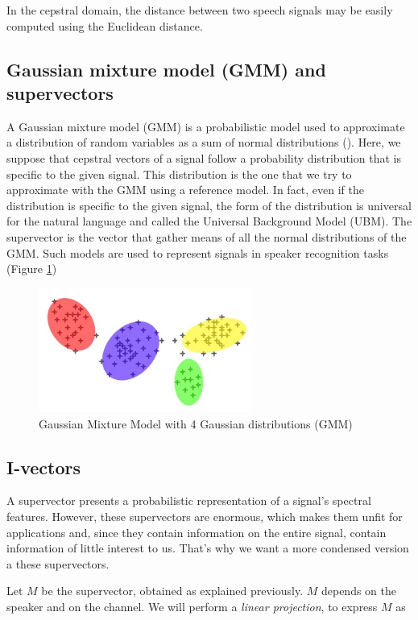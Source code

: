 \documentclass[conference]{IEEEtran}
\begin{document}
In the cepstral domain, the distance between two speech signals may be easily
computed using the Euclidean distance.


\subsection{Gaussian mixture model (GMM) and supervectors}

A Gaussian mixture model (GMM) is a probabilistic model used to approximate a
distribution of random variables as a sum of normal distributions (\cite{Bimbot2004}).
Here, we suppose that cepstral vectors of a signal follow a probability
distribution that is specific to the given signal. This distribution is the one
that we try to approximate with the GMM using a reference model. In fact, even
if the distribution is specific to the given signal, the form of the
distribution is universal for the natural language and called the Universal
Background Model (UBM). The supervector is the vector that gather means of
all the normal distributions of the GMM. Such models are used to represent
signals in speaker recognition tasks (Figure \ref{gmm})\\


\begin{figure}[!h]
    \centering
    \includegraphics[width=7cm]{GMM.jpg}
    \caption{Gaussian Mixture Model with 4 Gaussian distributions (GMM)}
    \label{gmm}
\end{figure}

\subsection{I-vectors}

A supervector presents a probabilistic representation of a signal's spectral features.
However, these supervectors are enormous, which makes them unfit for
applications and, since they contain information on the entire signal, contain
information of little interest to us.
That's why we want a more condensed version a these supervectors.


Let $M$ be the supervector, obtained as explained previously. $M$ depends on the speaker and on the channel.
We will perform a \emph{linear projection}, to express $M$ as
\end{document}
